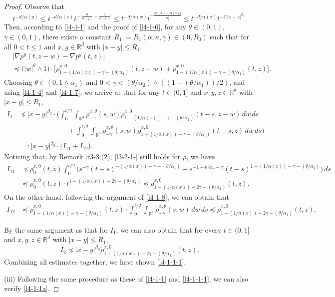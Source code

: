 \documentclass[a4paper,11pt]{amsart}
\renewcommand{\le}{\leqslant}
\newcommand{\R}{\mathds R}
\newcommand{\B}{\beta}
\newcommand{\T}{\theta}
\newcommand{\p}{\preceq}
\newcommand{\K}{\kappa}
\newcommand{\A}{\alpha}
\newcommand{\G}{\gamma}
\theoremstyle{definition}
\begin{document}
\begin{proof}
Observe that
$$
t^{-d/\A(y)}\le t^{-d/\A(x)}t^{-\big|\frac{d}{\A(y)}-\frac{d}{\A(x)}\big|}\le
t^{-d/\A(x)}t^{-\frac{|\A(x)-\A(z)|}{\A_1^2}}\le t^{-d/\A(x)}t^{-C|x-z|^{\B_0}}.
$$
Then, according to \eqref{l4-4-1} and the proof of \eqref{l4-1-6},
for any $\T \in (0,1)$, $\G\in (0,1)$, there exists a
constant $R_1:=R_1(\A,\K,\G)\in(0,R_0)$ such that for all $0<t \le 1$ and
 $x,y\in\R^d$ with $|x-y|\le R_1$,
\begin{equation}\label{l4-1-7}
\begin{split}
&\left|\nabla p^y(t,z-w)-\nabla p^y(t,z)\right|\\
&\p \big(|w|^{\T}\wedge 1\big)\cdot
\big[\rho^{x,0}_{1-(1/\A(x))-\G-({\theta}/{\A_1})}(t,z-w)+\rho^{x,0}_{1-(1/\A(x))-\G-({\theta}/{\A_1})}(t,z)\big].
\end{split}
\end{equation}
Choosing $\theta\in(0,1\wedge \A_1)$ and $0<\gamma<({\theta}/{\A_2})\wedge ((1-({\theta}/{\A_1}))/2)$, and using
\eqref{l4-1-4} and \eqref{l4-1-7}, we arrive at that for any $t\in(0,1]$ and $x,y,z\in \R^d$ with $|x-y|\le R_1$,
\begin{align*}
I_1&\p |x-y|^{\B_0}\cdot\bigg(\int_0^{{t}/{2}}\int_{\R^d}\tilde \rho^{x,\T}_{-\G}(s,w)\tilde \rho^{x,0}_{1-(1/\A(x))-\G-({\T}/{\A_1})}(t-s,z-w)\,dw\,ds\\
&\qquad\qquad \qquad\quad +\int_0^{{t}/{2}}\int_{\R^d}\tilde \rho^{x,\T}_{-\G}(s,w)
\tilde \rho^{x,0}_{1-(1/\A(x))-\G-({\T}/{\A_1})}(t-s,z)\,dw\,ds\bigg)\\
&=:|x-y|^{\B_0}\cdot \big(I_{11}+I_{12}\big).
\end{align*}
Noticing that, by Remark \ref{r3-3}(2),  \eqref{l3-2-1-} still holds for $\tilde \rho$, we have
\begin{align*}
I_{11}&\p \tilde \rho^{x,0}_0(t,z)\int_0^{t/2}
\Big(s^{-\G}(t-s)^{-(1/\A(x))-\G-(\theta/\A_1)}+s^{-1+\theta/\A_2-\G}(t-s)^{1-(1/\A(x))-\G-(\theta/\A_1)}\Big)\,ds\\
&\p \tilde \rho^{x,0}_0(t,z) \cdot t^{1-(1/\A(x))-2\G-(\theta/\A_1)}\p
 \tilde \rho^{x,0}_{1-(1/\A(x))-2\G-(\theta/\A_1)}(t,z).
\end{align*}
On the other hand, following the argument of  \eqref{l4-1-8}, we can obtain that
\begin{align*}
I_{12}&\p \tilde \rho^{x,0}_{1-(1/\A(x))-\G-(\theta/\A_1)}(t,z)\cdot\int_0^{t/2}
\int_{\R^d}\tilde \rho^{x,\theta}_{-\G}(s,w)\,dw\,ds\p \tilde \rho^{x,0}_{1-(1/\A(x))-2\G-(\theta/\A_1)}(t,z).
\end{align*}

By the same argument as that for $I_1$, we can also obtain that for every $t \in (0,1]$ and
$x,y,z\in \R^d$ with $|x-y|\le R_1$,
\begin{equation*}
I_2\p |x-y|^{\B_0}\tilde \rho^{x,0}_{1-(1/\A(x))-2\G-(\theta/\A_1)}(t,z).
\end{equation*}
Combining all estimates together, we have shown
\eqref{l4-1-1-1}.

(iii) Following the same procedure as these of \eqref{l4-1-1} and \eqref{l4-1-1-1}, we can also
verify \eqref{l4-1-1a}.
\end{proof}
\end{document}
